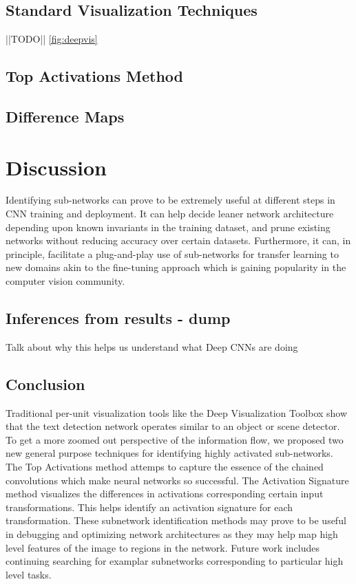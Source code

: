 \documentclass[10pt,twocolumn,letterpaper]{article}
\begin{document}
\subsection{Standard Visualization Techniques}
||TODO||
\ref{fig:deepvis}


\subsection{Top Activations Method}

\subsection{Difference Maps}




\section{Discussion}
Identifying sub-networks can prove to be extremely useful at different steps in CNN training and deployment. It can help decide leaner network architecture depending upon known invariants in the training dataset, and prune existing networks without reducing accuracy over certain datasets. Furthermore, it can, in principle, facilitate a plug-and-play use of sub-networks for transfer learning to new domains akin to the fine-tuning approach which is gaining popularity in the computer vision community.

\subsection{Inferences from results - dump}
Talk about why this helps us understand what Deep CNNs are doing


\subsection{Conclusion}
Traditional per-unit visualization tools like the Deep Visualization Toolbox \cite{yosinski2015understanding} show that the text detection network operates similar to an object or scene detector. To get a more zoomed out perspective of the information flow, we proposed two new general purpose techniques for identifying highly activated sub-networks. The Top Activations method attemps to capture the essence of the chained convolutions which make neural networks so successful. The Activation Signature method visualizes the differences in activations corresponding certain input transformations. This helps identify an activation signature for each transformation. These subnetwork identification methods may prove to be useful in debugging and optimizing network architectures as they may help map high level features of the image to regions in the network. Future work includes continuing searching for examplar subnetworks corresponding to particular high level tasks.


{\small


}
\end{document}
